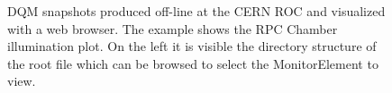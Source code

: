 \documentclass[a4paper]{cmspaper}
\begin{document}
\begin{figure}[hbtp]
  \begin{center}
\caption{DQM snapshots produced off-line at the CERN ROC and visualized with a web browser. The example shows the RPC Chamber illumination plot. On
the left it is visible the directory structure of the root file which can be browsed to select the MonitorElement to view.}
\label{fig:web_browser_plot}
 \end{center}
\end{figure}
%
\end{document}
